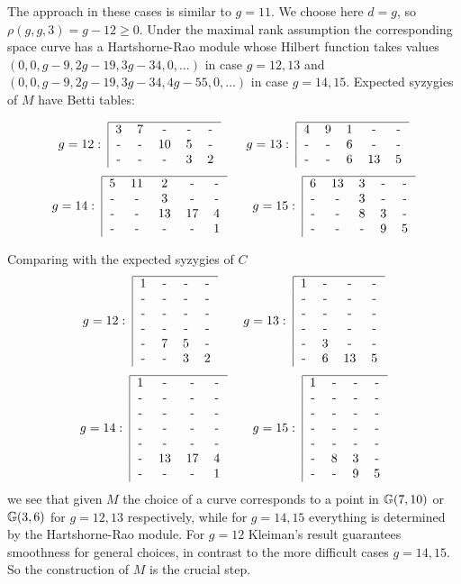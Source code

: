 The approach in these cases is similar to $g=11$. We choose here $d=g$, 
so $\rho(g,g,3)=g-12\ge 0$. 
Under the maximal rank assumption the corresponding space curve has
a Hartshorne-Rao module whose Hilbert function takes values 
$(0,0,g-9,2g-19,3g-34,0,\ldots)$ in case $g=12,13$ 
and $(0,0,g-9,2g-19,3g-34,4g-55,0,\ldots)$ in case $g=14,15$.
Expected syzygies of $M$ have Betti tables:

$$g=12: \;
\begin{tabular}{|ccccc}\hline
3 & 7 & - & - & -  \cr
- & - & 10 & 5 & - \cr
- & - & - & 3 & 2  \cr
\end{tabular}
\qquad
g=13: \;
\begin{tabular}{|ccccc}\hline
4 & 9 & 1 & - & -  \cr
- & - & 6 & - & - \cr
- & - & 6 & 13 & 5  \cr
\end{tabular}
$$
\medskip
$$g=14: \;
\begin{tabular}{|ccccc}\hline
5 & 11 & 2 & - & -  \cr
- & - & 3 & - & - \cr
- & - & 13 & 17 & 4  \cr
- & - & - & - & 1 \cr
\end{tabular}
\qquad
g=15: \;
\begin{tabular}{|ccccc}
\hline
6 & 13 & 3 & - & -  \cr
- & - & 3 & - & - \cr
- & - & 8 & 3 & -  \cr
- & - & - & 9 & 5 \cr
\end{tabular}
$$

\medskip
Comparing with the expected syzygies of $C$ 
$$g=12: \;
\begin{tabular}{|cccc}\hline
 1 & - & - & -  \cr
 - & - & - & -  \cr
 - & - & - & -  \cr
 - & - & - & -  \cr
 - & 7 & 5 & - \cr
 - & - & 3 & 2  \cr
\end{tabular}
\qquad
g=13: \;
\begin{tabular}{|cccc}\hline
 1 & - & - & -  \cr
 - & - & - & -  \cr
 - & - & - & -  \cr
 - & - & - & -  \cr
 - & 3 & - & - \cr
 - & 6 & 13 & 5  \cr
\end{tabular}
$$
\medskip
$$g=14: \;
\begin{tabular}{|cccc}\hline
 1 & - & - & -  \cr
 - & - & - & -  \cr
 - & - & - & -  \cr 
- & - & - & -  \cr 
- & - & - & -  \cr
 - & 13 & 17 & 4  \cr
 - & - & - & 1 \cr
\end{tabular}
\qquad
g=15: \;
\begin{tabular}{|cccc}
\hline
 1 & - & - & -  \cr 
 - & - & - & -  \cr
- & - & - & -  \cr
 - & - & - & -  \cr
 - & - & - & -  \cr
 - & 8 & 3 & -  \cr
 - & - & 9 & 5 \cr
\end{tabular}
$$
we see that given  $M$ the choice of a curve corresponds to a point
in ${\mathbb G}(7,10)$ or ${\mathbb G}(3,6)$ for $g=12,13$ respectively, 
while for $g=14,15$ everything is determined by the Hartshorne-Rao module. 
For $g=12$ Kleiman's result guarantees smoothness for general choices,
in contrast to the more difficult cases $g=14,15$. 
So the construction of $M$ is the crucial step. 




